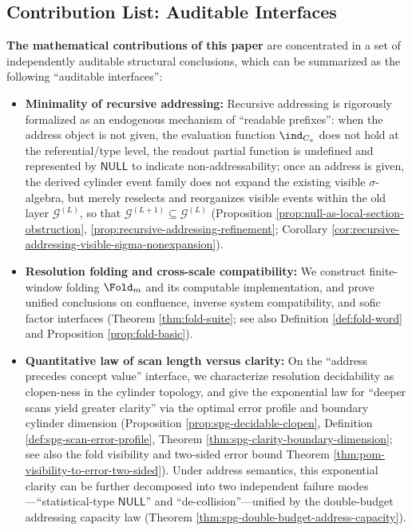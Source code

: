 \subsection{Contribution List: Auditable Interfaces}\label{subsec:contrib-scope}
\textbf{The mathematical contributions of this paper} are concentrated in a set of independently auditable structural conclusions, which can be summarized as the following ``auditable interfaces'':
\begin{itemize}
  \item \textbf{Minimality of recursive addressing:} Recursive addressing is rigorously formalized as an endogenous mechanism of ``readable prefixes'': when the address object is not given, the evaluation function \(\ind_{C_a}\) does not hold at the referential/type level, the readout partial function is undefined and represented by \(\mathsf{NULL}\) to indicate non-addressability; once an address is given, the derived cylinder event family does not expand the existing visible \(\sigma\)-algebra, but merely reselects and reorganizes visible events within the old layer \(\mathcal{G}^{(L)}\), so that \(\mathcal{G}^{(L+1)}\subseteq \mathcal{G}^{(L)}\) (Proposition \ref{prop:null-as-local-section-obstruction}, \ref{prop:recursive-addressing-refinement}; Corollary \ref{cor:recursive-addressing-visible-sigma-nonexpansion}).
  \item \textbf{Resolution folding and cross-scale compatibility:} We construct finite-window folding \(\Fold_m\) and its computable implementation, and prove unified conclusions on confluence, inverse system compatibility, and sofic factor interfaces (Theorem \ref{thm:fold-suite}; see also Definition \ref{def:fold-word} and Proposition \ref{prop:fold-basic}).
  \item \textbf{Quantitative law of scan length versus clarity:} On the ``address precedes concept value'' interface, we characterize resolution decidability as clopen-ness in the cylinder topology, and give the exponential law for ``deeper scans yield greater clarity'' via the optimal error profile and boundary cylinder dimension (Proposition \ref{prop:spg-decidable-clopen}, Definition \ref{def:spg-scan-error-profile}, Theorem \ref{thm:spg-clarity-boundary-dimension}; see also the fold visibility and two-sided error bound Theorem \ref{thm:pom-visibility-to-error-two-sided}). Under address semantics, this exponential clarity can be further decomposed into two independent failure modes---``statistical-type \(\mathsf{NULL}\)'' and ``de-collision''---unified by the double-budget addressing capacity law (Theorem \ref{thm:spg-double-budget-address-capacity}).

\end{itemize}
